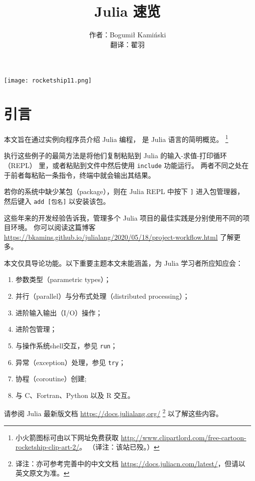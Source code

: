 \documentclass[10pt,a4paper]{article}
\begin{document}
\title{Julia 速览}
\author{作者：Bogumi\l{} Kami\'n{}ski\\翻译：翟羽}
\maketitle

{\centering
\texttt{[image: rocketship11.png]}\par
}

\tableofcontents

\section{引言}
本文旨在通过实例向程序员介绍 Julia 编程，
是 Julia 语言的简明概览。
\footnote{小火箭图标可由以下网址免费获取  \url{http://www.clipartlord.com/free-cartoon-rocketship-clip-art-2/}。
（译注：该站已殁。）}

执行这些例子的最简方法是将他们复制粘贴到 Julia 的输入-求值-打印循环（REPL） 里，或者粘贴到文件中然后使用 \lstinline|include| 功能运行。
两者不同之处在于前者每粘贴一条指令，终端中就会输出其结果。

若你的系统中缺少某包（package），则在 Julia REPL 中按下 \lstinline|]| 进入包管理器，
然后键入 \lstinline|add [包名]| 以安装该包。

这些年来的开发经验告诉我，管理多个 Julia 项目的最佳实践是分别使用不同的项目环境。
你可以阅读这篇博客
\url{https://bkamins.github.io/julialang/2020/05/18/project-workflow.html} 
了解更多。

本文仅具导论功能。以下重要主题本文未能涵盖，为 Julia 学习者所应知应会：
\begin{enumerate}[label=\arabic*),nolistsep]
  \item 参数类型（parametric types）；
  \item 并行（parallel）与分布式处理（distributed processing）；
  \item 进阶输入输出（I/O）操作；
  \item 进阶包管理；
  \item 与操作系统shell交互，参见 \lstinline|run|；
  \item 异常（exception）处理，参见 \lstinline|try|；
  \item 协程（coroutine）创建;
  \item 与 C、Fortran、Python 以及 R 交互。
\end{enumerate}
请参阅 Julia 最新版文档 \url{https://docs.julialang.org/} 
\footnote{译注：亦可参考完善中的中文文档 \url{https://docs.juliacn.com/latest/}，但请以英文原文为准。} 以了解这些内容。
\end{document}
